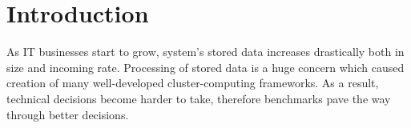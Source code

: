 \documentclass[report.tex]{subfiles}
\begin{document}
\section{Introduction}
As IT businesses start to grow, system's stored data increases drastically both in size and incoming rate. Processing of stored data is a huge concern which caused creation of many well-developed cluster-computing frameworks. As a result, technical decisions become harder to take, therefore benchmarks pave the way through better decisions.
\end{document}

